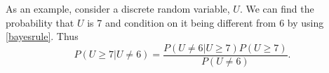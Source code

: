 \begin{comment}
\begin{theorem}[Bayes' Theorem]
\label{bayestheorem}
Consider two continuous random variables, $U$ and $\Theta$, that both have a nonzero probability. If both $P(U=u|\Theta=\theta)$ and $P(\Theta=\theta)$ exist for all $\theta$, then 
\begin{equation}
    \label{bayesrule}
    P(\Theta=\theta|U=u) = \frac{P(U=u|\Theta=\theta)P(\Theta=\theta)}{\int_{-\infty}^{\infty} P(U=u|\Theta=\theta)P(\Theta=\theta) \: \dd \theta}.
\end{equation}
$P(\Theta=\theta)$ is the prior probability/density of $\Theta$, and it represents the prior knowledge we have about that parameter. $P(\Theta=\theta|U=u)$ is called the posterior of $\Theta$, which is the probability density after we have observed that $U=u$ \citep{schay2016introduction}. 
\end{theorem}


From \eqref{lawoftotprob} we see that the denominator is the probability that $U=u$,
\begin{equation*}
    \int_{-\infty}^{\infty} P(U=u|\Theta=\theta)P(\Theta=\theta) \: \dd \theta = P(U=u).
\end{equation*}
Thus, Bayes' theorem can be reformulated as
\begin{equation}
    \label{Bayesrule2}
     P(\Theta=\theta|U=u) = \frac{P(U=u|\Theta=\theta)P(\Theta=\theta)}{P(U=u)}.
\end{equation}


As an example, consider a random variable $U$ that is binomial distributed with parameters $n$ and $\theta$. Thus,
\begin{equation*}
    U|\theta \sim \mathrm{Binomial}(n,\theta).
\end{equation*}
Using Theorem \ref{bayestheorem} and \eqref{Bayesrule2}, we get that the posterior probability of $\Theta|U$ is
\begin{equation*}
    P(\Theta=\theta|U=u) = \frac{P(U=u|\Theta=\theta)P(\Theta=\theta)}{P(U=u)}.
\end{equation*}

\end{comment}

As an example, consider a discrete random variable, $U$. We can find the probability that $U$ is 7 and condition on it being different from 6 by using \eqref{bayesrule}. Thus
\begin{equation}
    P(U\geq 7|U\neq6) = \frac{P(U\neq6|U\geq7)P(U\geq7)}{P(U\neq6)}.
\end{equation}

